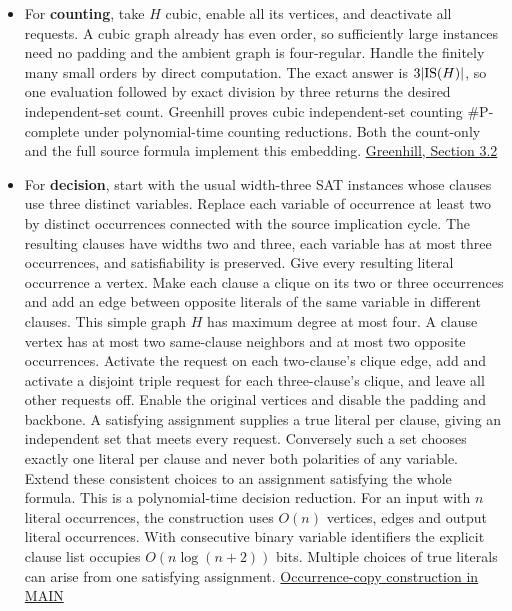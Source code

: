\documentclass[
  11pt,
]{article}
\providecommand{\tightlist}{%
  \setlength{\itemsep}{0pt}\setlength{\parskip}{0pt}}
\begin{document}
\begin{itemize}
\tightlist
\item
  For \textbf{counting}, take \(H\) cubic, enable all its vertices, and
  deactivate all requests. A cubic graph already has even order, so
  sufficiently large instances need no padding and the ambient graph is
  four-regular. Handle the finitely many small orders by direct
  computation. The exact answer is \(3|{\rm IS}(H)|\), so one evaluation
  followed by exact division by three returns the desired
  independent-set count. Greenhill proves cubic independent-set counting
  \(\#\mathrm P\)-complete under polynomial-time counting reductions.
  Both the count-only and the full source formula implement this
  embedding.
  \href{https://web.maths.unsw.edu.au/~csg/papers/complexity.pdf}{Greenhill,
  Section 3.2}
\item
  For \textbf{decision}, start with the usual width-three SAT instances
  whose clauses use three distinct variables. Replace each variable of
  occurrence at least two by distinct occurrences connected with the
  source implication cycle. The resulting clauses have widths two and
  three, each variable has at most three occurrences, and satisfiability
  is preserved. Give every resulting literal occurrence a vertex. Make
  each clause a clique on its two or three occurrences and add an edge
  between opposite literals of the same variable in different clauses.
  This simple graph \(H\) has maximum degree at most four. A clause
  vertex has at most two same-clause neighbors and at most two opposite
  occurrences. Activate the request on each two-clause's clique edge,
  add and activate a disjoint triple request for each three-clause's
  clique, and leave all other requests off. Enable the original vertices
  and disable the padding and backbone. A satisfying assignment supplies
  a true literal per clause, giving an independent set that meets every
  request. Conversely such a set chooses exactly one literal per clause
  and never both polarities of any variable. Extend these consistent
  choices to an assignment satisfying the whole formula. This is a
  polynomial-time decision reduction. For an input with \(n\) literal
  occurrences, the construction uses \(O(n)\) vertices, edges and output
  literal occurrences. With consecutive binary variable identifiers the
  explicit clause list occupies \(O(n\log(n+2))\) bits. Multiple choices of true
  literals can arise from one satisfying assignment.
  \href{https://github.com/openai/math/blob/main/preprints/The-Exponential-Time-Hypothesis-is-False-October-25-2026/build/main_full_version.tex\#L1465}{Occurrence-copy
  construction in MAIN}
\end{itemize}
\end{document}
